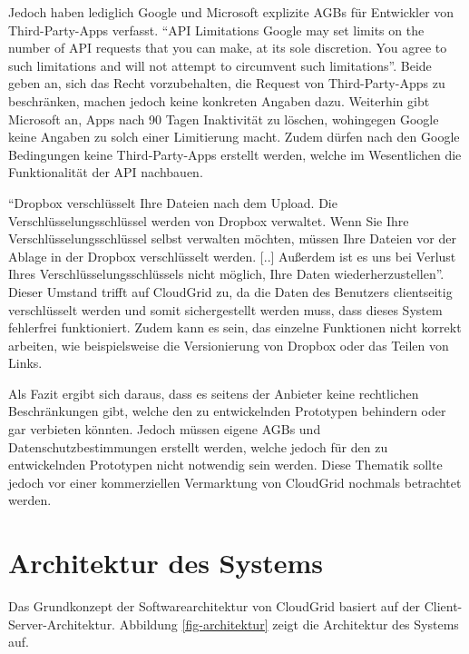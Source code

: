 Jedoch haben lediglich Google und Microsoft explizite \acp{AGB} für Entwickler von Third-Party-Apps verfasst.
"`API Limitations Google may set limits on the number of API requests that you can make, at its sole discretion. You agree to such limitations and will not attempt to circumvent such limitations"'\cite{goog11}.
Beide geben an, sich das Recht vorzubehalten, die Request von Third-Party-Apps zu beschränken, machen jedoch keine konkreten Angaben dazu\cite[vgl.][]{goog11, sky-dev}.
Weiterhin gibt Microsoft an, \acp{App} nach 90 Tagen Inaktivität zu löschen, wohingegen Google keine Angaben zu solch einer Limitierung macht\cite[vgl.][]{sky-dev}.
Zudem dürfen nach den Google Bedingungen keine Third-Party-Apps erstellt werden, welche im Wesentlichen die Funktionalität der \ac{API} nachbauen\cite[vgl.][]{goog11}.

"`Dropbox verschlüsselt Ihre Dateien nach dem Upload. Die Verschlüsselungsschlüssel werden von Dropbox verwaltet. Wenn Sie Ihre Verschlüsselungsschlüssel selbst verwalten möchten, müssen Ihre Dateien vor der Ablage in der Dropbox verschlüsselt werden. [..] Außerdem ist es uns bei Verlust Ihres Verschlüsselungsschlüssels nicht möglich, Ihre Daten wiederherzustellen"'\cite{dros13}.
Dieser Umstand trifft auf CloudGrid zu, da die Daten des Benutzers clientseitig verschlüsselt werden und somit sichergestellt werden muss, dass dieses System fehlerfrei funktioniert.
Zudem kann es sein, das einzelne Funktionen nicht korrekt arbeiten, wie beispielsweise die Versionierung von Dropbox oder das Teilen von Links\cite[vgl.][]{dros13}.

Als Fazit ergibt sich daraus, dass es seitens der Anbieter keine rechtlichen Beschränkungen gibt, welche den zu entwickelnden Prototypen behindern oder gar verbieten könnten.
Jedoch müssen eigene \acp{AGB} und Datenschutzbestimmungen erstellt werden, welche jedoch für den zu entwickelnden Prototypen nicht notwendig sein werden.
Diese Thematik sollte jedoch vor einer kommerziellen Vermarktung von CloudGrid nochmals betrachtet werden.

\section{Architektur des Systems}
\label{systementwurf-architektur}
Das Grundkonzept der Softwarearchitektur von CloudGrid basiert auf der Client-Server-Architektur.
Abbildung \ref{fig-architektur} zeigt die Architektur des Systems auf.

